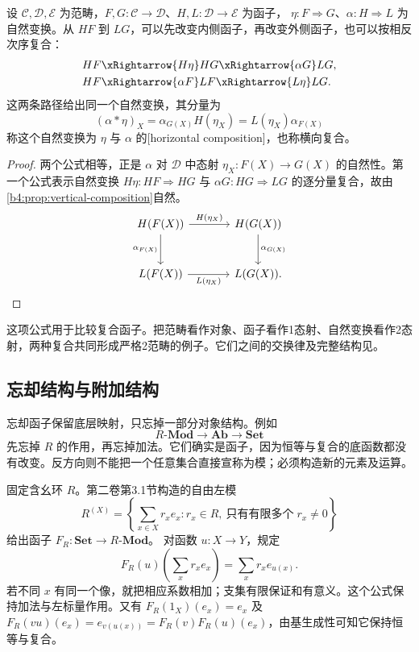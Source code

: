 \begin{proposition}\label{b4:prop:horizontal-composition}
	设 \(\mathcal C,\mathcal D,\mathcal E\) 为范畴，\(F,G:\mathcal C\rightarrow\mathcal D\)、\(H,L:\mathcal D\rightarrow\mathcal E\) 为函子， \(\eta:F\Rightarrow G\)、\(\alpha:H\Rightarrow L\) 为自然变换。从 \(HF\) 到 \(LG\)，可以先改变内侧函子，再改变外侧函子，也可以按相反次序复合：
	\[
		\begin{aligned}
			HF&\xRightarrow{H\eta}HG\xRightarrow{\alpha G}LG,\\
			HF&\xRightarrow{\alpha F}LF\xRightarrow{L\eta}LG.
		\end{aligned}
	\]
	这两条路径给出同一个自然变换，其分量为
	\[
		(\alpha*\eta)_X =\alpha_{G(X)}H(\eta_X) =L(\eta_X)\alpha_{F(X)}
	\]
	称这个自然变换为 \(\eta\) 与 \(\alpha\) 的[horizontal composition]，也称横向复合。
\end{proposition}
\begin{proof}
	两个公式相等，正是 \(\alpha\) 对 \(\mathcal D\) 中态射 \(\eta_X:F(X)\rightarrow G(X)\) 的自然性。第一个公式表示自然变换 \(H\eta:HF\Rightarrow HG\) 与 \(\alpha G:HG\Rightarrow LG\) 的逐分量复合，故由\cref{b4:prop:vertical-composition}自然。
	\[
		\begin{tikzcd}[column sep=large,row sep=large]
			H(F(X))\arrow[r,"H(\eta_X)"]\arrow[d,"\alpha_{F(X)}"']& H(G(X))\arrow[d,"\alpha_{G(X)}"]\\
			L(F(X))\arrow[r,"L(\eta_X)"']&L(G(X)).
		\end{tikzcd}
	\]
\end{proof}

这项公式用于比较复合函子。把范畴看作对象、函子看作1态射、自然变换看作2态射，两种复合共同形成严格2范畴的例子。它们之间的交换律及完整结构见。

\subsection{忘却结构与附加结构}
\label{b4:subsec:0102:03}

忘却函子保留底层映射，只忘掉一部分对象结构。例如
\[
	R\text{-}\mathbf{Mod}\longrightarrow\mathbf{Ab} \longrightarrow\mathbf{Set}
\]
先忘掉 \(R\) 的作用，再忘掉加法。它们确实是函子，因为恒等与复合的底函数都没有改变。反方向则不能把一个任意集合直接宣称为模；必须构造新的元素及运算。

\begin{example}\label{b4:ex:free-module-functor}
	固定含幺环 \(R\)。第二卷第3.1节构造的自由左模
	\[
		R^{(X)}=\left\{\sum_{x\in X}r_xe_x: r_x\in R,\ \text{只有有限多个}\;r_x\ne0\right\}
	\]
	给出函子 \(F_R:\mathbf{Set}\rightarrow R\text{-}\mathbf{Mod}\)。 对函数 \(u:X\rightarrow Y\)，规定
	\[
		F_R(u)\left(\sum_xr_xe_x\right)=\sum_xr_xe_{u(x)}.
	\]
	若不同 \(x\) 有同一个像，就把相应系数相加；支集有限保证和有意义。这个公式保持加法与左标量作用。又有 \(F_R(1_X)(e_x)=e_x\) 及 \(F_R(vu)(e_x)=e_{v(u(x))}=F_R(v)F_R(u)(e_x)\)，由基生成性可知它保持恒等与复合。
\end{example}

